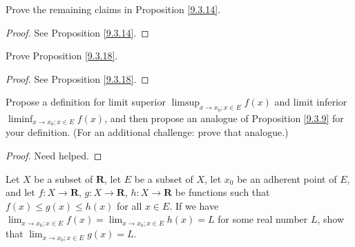 \begin{exercise}\label{ex 9.3.2}
    Prove the remaining claims in Proposition \ref{9.3.14}.
\end{exercise}

\begin{proof}
    See Proposition \ref{9.3.14}.
\end{proof}

\begin{exercise}\label{ex 9.3.3}
    Prove Proposition \ref{9.3.18}.
\end{exercise}

\begin{proof}
    See Proposition \ref{9.3.18}.
\end{proof}

\begin{exercise}\label{ex 9.3.4}
    Propose a definition for limit superior \(\limsup_{x \to x_0 ; x \in E} f(x)\) and limit inferior \(\liminf_{x \to x_0 ; x \in E} f(x)\), and then propose an analogue of Proposition \ref{9.3.9} for your definition.
    (For an additional challenge: prove that analogue.)
\end{exercise}

\begin{proof}
    Need helped.
\end{proof}

\begin{exercise}\label{ex 9.3.5}
    Let \(X\) be a subset of \(\mathbf{R}\), let \(E\) be a subset of \(X\), let \(x_0\) be an adherent point of \(E\), and let \(f : X \to \mathbf{R}\), \(g : X \to \mathbf{R}\), \(h : X \to \mathbf{R}\) be functions such that \(f(x) \leq g(x) \leq h(x)\) for all \(x \in E\).
    If we have \(\lim_{x \to x_0 ; x \in E} f(x) = \lim_{x \to x_0 ; x \in E} h(x) = L\) for some real number \(L\), show that \(\lim_{x \to x_0 ; x \in E} g(x) = L\).
\end{exercise}

